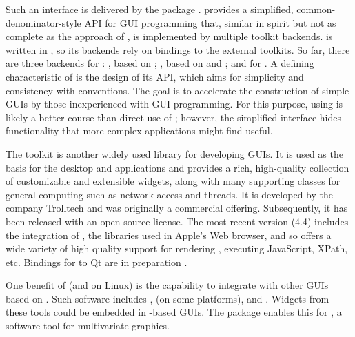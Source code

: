 \documentclass[article,shortnames]{jss}
\begin{document}
Such an interface is delivered by the  package
\citep{gWidgets}.  provides a simplified,
common-denominator-style API for GUI programming that, similar in
spirit but not as complete as the approach of , is
implemented by multiple toolkit backends.  is written in
, so its backends rely on bindings to the external
toolkits. So far, there are three backends for :
, based on ; , based
on  and ; and  for
.  A defining characteristic of  is the
design of its API, which aims for simplicity and consistency with
 conventions.  The goal is to accelerate the construction
of simple GUIs by those inexperienced with GUI programming. For this
purpose, using  is likely a better course than direct
use of ; however, the simplified interface hides
functionality that more complex applications might find useful.

The  toolkit \citep{Qt} is another widely used 
library for developing GUIs. It is used as the basis for the 
desktop and applications \citep{KDE} and provides a rich, high-quality
collection of customizable and extensible widgets, along with many
supporting classes for general computing such as network access and
threads. It is developed by the company Trolltech and was originally a
commercial offering. Subsequently, it has been released with an open
source license.  The most recent version (4.4) includes the
integration of  \citep{WebKit}, the libraries used in
Apple's  Web browser, and so offers a wide variety of high
quality support for rendering , executing JavaScript,
XPath, etc.  Bindings for  to Qt are in preparation \citep{qtinterfaces}.


One benefit of  (and  on Linux) is the
capability to integrate with other GUIs based on .
Such software includes ,  (on some
platforms), and . Widgets from these tools could be
embedded in -based GUIs. The  package enables
this for , a software tool for multivariate graphics. 
\end{document}
